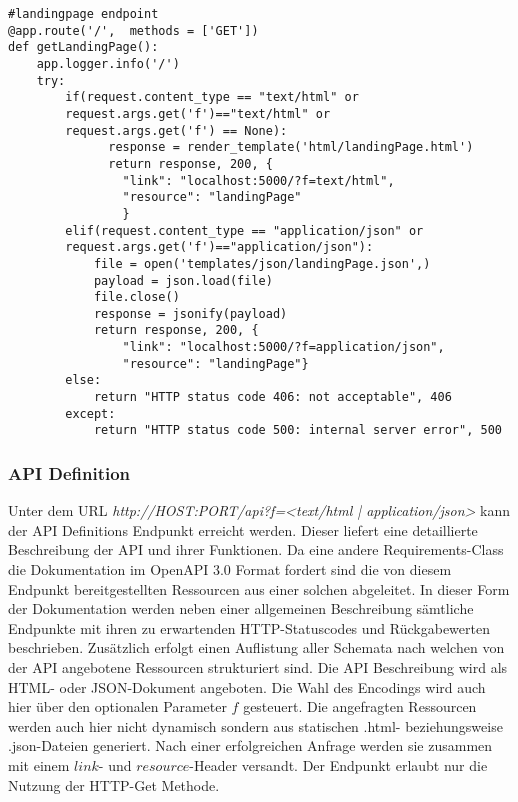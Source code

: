 \begin{lstlisting}[caption={Landing Page Endpoint}, style = Python]
#landingpage endpoint
@app.route('/',  methods = ['GET'])
def getLandingPage():
    app.logger.info('/') 
    try:
        if(request.content_type == "text/html" or
        request.args.get('f')=="text/html" or 
        request.args.get('f') == None):
              response = render_template('html/landingPage.html') 
              return response, 200, {
                "link": "localhost:5000/?f=text/html", 
                "resource": "landingPage"
                } 
        elif(request.content_type == "application/json" or
        request.args.get('f')=="application/json"): 
            file = open('templates/json/landingPage.json',) 
            payload = json.load(file) 
            file.close() 
            response = jsonify(payload) 
            return response, 200, {
                "link": "localhost:5000/?f=application/json", 
                "resource": "landingPage"} 
        else:
            return "HTTP status code 406: not acceptable", 406 
        except:
            return "HTTP status code 500: internal server error", 500 
\end{lstlisting}

\subsubsection{API Definition}
Unter dem URL \textit{http://HOST:PORT/api?f=<text/html | application/json>} kann der API Definitions Endpunkt erreicht werden. Dieser liefert eine detaillierte Beschreibung
der API und ihrer Funktionen.  Da eine andere Requirements-Class die Dokumentation im  OpenAPI 3.0 Format fordert sind die von diesem Endpunkt bereitgestellten Ressourcen aus 
einer solchen abgeleitet. In dieser Form der Dokumentation werden neben einer allgemeinen Beschreibung sämtliche Endpunkte mit ihren zu erwartenden HTTP-Statuscodes und 
Rückgabewerten beschrieben. Zusätzlich erfolgt einen Auflistung aller Schemata nach welchen von der API angebotene Ressourcen strukturiert sind. Die API Beschreibung wird
als HTML- oder JSON-Dokument angeboten. Die Wahl des Encodings wird auch hier über den optionalen Parameter $f$ gesteuert. Die angefragten Ressourcen werden auch hier nicht 
dynamisch sondern aus statischen .html- beziehungsweise .json-Dateien generiert. Nach einer erfolgreichen Anfrage werden sie zusammen mit einem $link$- und $resource$-Header versandt. 
Der Endpunkt erlaubt nur die Nutzung der HTTP-Get Methode.

